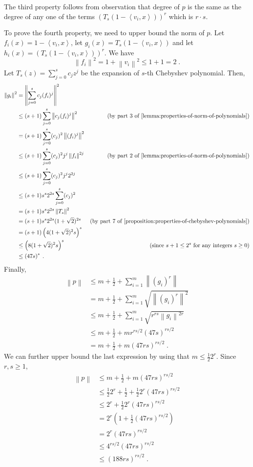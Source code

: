 \documentclass[12pt]{article}
\newcommand{\ip}[2]{\left\langle #1, #2 \right\rangle} %
\newcommand{\norm}[1]{\left\| #1 \right\|}  %
\begin{document}
The third property follows from observation that degree of $p$
is the same as the degree of any one of the terms
$\left( T_s(1 - \ip{v_i}{x}) \right)^r$ which is $r \cdot s$.

To prove the fourth property, we need to upper bound the norm of $p$.
Let $f_i(x) = 1 - \ip{v_i}{x}$, let $g_i(x) = T_s(1 - \ip{v_i}{x})$
and let $h_i(x) = (T_s(1 - \ip{v_i}{x}))^r$. We have
$$
\norm{f_i}^2 = 1 + \norm{v_i}^2 \le 1 + 1 = 2 \; .
$$
Let $T_s(z) = \sum_{j=0}^s c_j z^j$ be the expansion of $s$-th Chebyshev polynomial.
Then,
\begin{align*}
\norm{g_i}^2
& = \norm{ \sum_{j=0}^s c_j (f_i)^j }^2 \\
& \le (s + 1) \sum_{j=0}^s \norm{c_j (f_i)^j}^2 & \text{(by~part 3 of \autoref{lemma:properties-of-norm-of-polynomials})} \\
& = (s + 1) \sum_{j=0}^s (c_j)^2 \norm{(f_i)^j}^2 \\
& \le (s + 1) \sum_{j=0}^s (c_j)^2 j^j \norm{f_i}^{2j} & \text{(by~part 2 of \autoref{lemma:properties-of-norm-of-polynomials})} \\
& \le (s + 1) \sum_{j=0}^s (c_j)^2 j^j 2^{2j} \\
& \le (s + 1) s^s 2^{2s} \sum_{j=0}^s (c_j)^2 \\
& = (s + 1) s^s 2^{2s} \norm{T_s}^2 \\
& = (s + 1) s^s 2^{2s} (1 + \sqrt{2})^{2s} & \text{(by~part 7 of \autoref{proposition:properties-of-chebyshev-polynomials})} \\
& = (s + 1) \left(4(1+\sqrt{2})^2 s \right)^s \\
& \le \left(8(1+\sqrt{2})^2 s \right)^s & \text{(since $s+1 \le 2^s$ for any integers $s \ge 0$)} \\
& \le \left(47 s \right)^s \; .
\end{align*}
Finally,
\begin{align*}
\norm{p}
& \le m + \frac{1}{2} + \sum_{i=1}^m \norm{(g_i)^r} \\
& = m + \frac{1}{2} + \sum_{i=1}^m \sqrt{\norm{(g_i)^r}^2} \\
& \le m + \frac{1}{2} + \sum_{i=1}^m \sqrt{r^{rs} \norm{g_i}^{2r}} \\
& \le m + \frac{1}{2} + m r^{rs/2} \left(47 s \right)^{rs/2} \\
& = m + \frac{1}{2} + m \left(47 rs \right)^{rs/2} \; .
\end{align*}
We can further upper bound the last expression by using that $m \le \frac{1}{2} 2^r$.
Since $r,s \ge 1$,
\begin{align*}
\norm{p}
& \le m + \frac{1}{2} + m \left(47 rs \right)^{rs/2} \\
& \le \frac{1}{2} 2^r + \frac{1}{2} + \frac{1}{2} 2^r \left(47 rs \right)^{rs/2} \\
& \le 2^r + \frac{1}{2} 2^r \left(47 rs \right)^{rs/2} \\
& = 2^r \left(1 + \frac{1}{2} \left(47 rs \right)^{rs/2} \right) \\
& = 2^r \left(47 rs \right)^{rs/2} \\
& \le 4^{rs/2} \left(47 rs \right)^{rs/2} \\
& \le \left(188 rs \right)^{rs/2} \; .
\end{align*}
\end{document}
